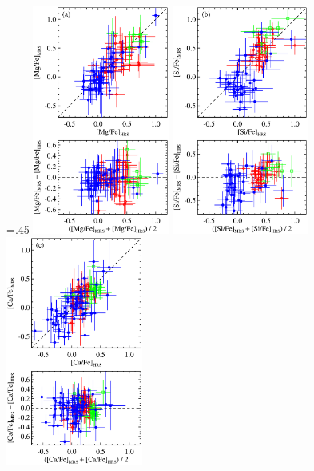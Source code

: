 \documentclass{emulateapj}
\begin{document}
\begin{figure}[p!]
\centering
 \columnwidth=.45\columnwidth
 \includegraphics[width=0.4\textwidth]{mgfe_compare_orthogonal.eps}
 \hfil
 \includegraphics[width=0.4\textwidth]{sife_compare_orthogonal.eps}
 \hfil
 \includegraphics[width=0.4\textwidth]{cafe_compare_orthogonal.eps}

\end{figure}
\end{document}
